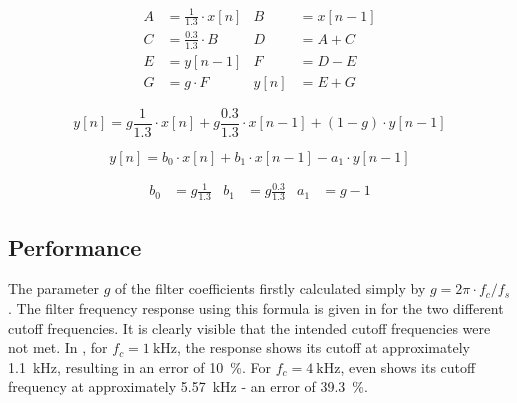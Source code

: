 \documentclass[a4paper, 12pt]{article}
\begin{document}
\begin{align}
	\label{eq:nodes1}
	A &= \frac{1}{1.3} \cdot x[n] & B &= x[n-1] \\
	\label{eq:nodes2}
	C &= \frac{0.3}{1.3} \cdot B & D &= A + C \\
	\label{eq:nodes3}
	E &= y[n-1] & F &= D - E \\
	\label{eq:nodes4}
	G &= g \cdot F & y[n] &= E + G
\end{align}

\begin{equation}
	\label{eq:filter}
	y[n] = g \frac{1}{1.3} \cdot x[n] +
	g \frac{0.3}{1.3} \cdot x[n-1] +
	(1-g) \cdot y[n-1]
\end{equation}

\begin{equation}
	\label{eq:first-order-iir}
	y[n] = b_0 \cdot x[n] + 
	b_1 \cdot x[n-1] - 
	a_1 \cdot y[n-1]
\end{equation}

\begin{align}
	\label{eq:coefficients}
	b_0 &= g \frac{1}{1.3} &
	b_1 &= g \frac{0.3}{1.3} &
	a_1 &= g - 1
\end{align}

\subsection{Performance}

The parameter $g$ of the filter coefficients firstly calculated simply by $g = 2 \pi \cdot f_c / f_s$. The filter frequency response using this formula is given in  for the two different cutoff frequencies. It is clearly visible that the intended cutoff frequencies were not met. In , for $f_c = \SI{1}{\kilo\hertz}$, the response shows its cutoff at approximately \SI{1.1}{\kilo\hertz}, resulting in an error of \SI{10}{\percent}. For $f_c = \SI{4}{\kilo\hertz}$,  even shows its cutoff frequency at approximately \SI{5.57}{\kilo\hertz} - an error of \SI{39.3}{\percent}.
\end{document}
